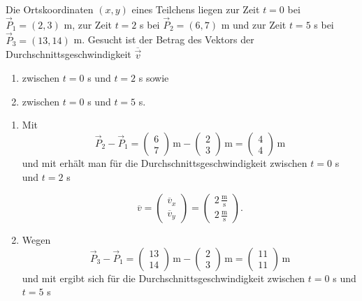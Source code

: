 \begin{MExercises}
            \begin{MExercise}
                 Die Ortskoordinaten $(x,y)$ eines Teilchens liegen zur Zeit $t=0$ bei $\vec{P}_1=(2,3)$ m, zur Zeit $t= 2$ s bei $\vec{P}_2=(6,7)$ m und zur Zeit $t= 5$ s bei $\vec{P}_3=(13,14)$ m. Gesucht ist der Betrag des Vektors der Durchschnittsgeschwindigkeit $\overline{\vec{v}}$
                 \begin{enumerate}
                 \item zwischen $t=0$ s und $t=2$ s sowie
                 \item zwischen $t=0$ s und $t=5$ s. 
                 \end{enumerate} 
                 \begin{MSolution}
                 \begin{enumerate}
                 \item  Mit 
                 $$
                 \vec{P}_2-\vec{P}_1=\left(\begin{array}{c} 6 \\ 7 \end{array}\right)\,\text{m}-\left(\begin{array}{c} 2 \\ 3 \end{array}\right)\,\text{m}=\left(\begin{array}{c} 4 \\4 \end{array}\right)\,\text{m}
                 $$ und mit  erh\"alt man f\"ur die Durchschnittsgeschwindigkeit zwischen $t=0$ s und $t=2$ s
                
                 $$
                 \overline{v}= \left(\begin{array}{c} \overline{v}_x \\ \overline{v}_y \end{array}\right)=\left(\begin{array}{c} 2\,\frac{\text{m}}{\text{s}}\\ 2\,\frac{\text{m}}{\text{s}} \end{array}\right).
                 $$
                 \item  Wegen 
                  $$
                  \vec{P}_3-\vec{P}_1=\left(\begin{array}{c} 13 \\ 14 \end{array}\right)\,\text{m}-\left(\begin{array}{c} 2 \\ 3 \end{array}\right)\,\text{m}=\left(\begin{array}{c} 11 \\11 \end{array}\right)\,\text{m}
                   $$ und mit  ergibt sich f\"ur die Durchschnittsgeschwindigkeit zwischen $t=0$ s und $t=5$ s
                                 

\end{enumerate}
\end{MSolution}
\end{MExercise}
\end{MExercises}
